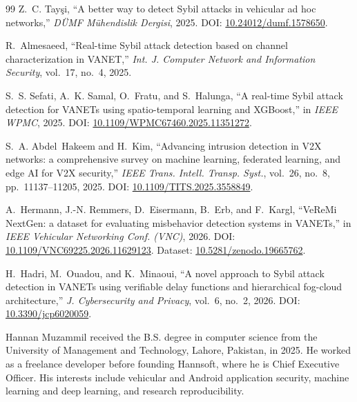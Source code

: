 \documentclass[journal,twoside]{IEEEtran}
\begin{document}
\begin{thebibliography}{99}
 Z.~C. Tay\c{s}i, ``A better way to detect Sybil attacks in vehicular ad hoc networks,'' \emph{D\"UMF M\"uhendislik Dergisi}, 2025. DOI: \url{10.24012/dumf.1578650}.

 R.~Almesaeed, ``Real-time Sybil attack detection based on channel characterization in VANET,'' \emph{Int. J. Computer Network and Information Security}, vol.~17, no.~4, 2025.

 S.~S. Sefati, A.~K. Samal, O.~Fratu, and S.~Halunga, ``A real-time Sybil attack detection for VANETs using spatio-temporal learning and XGBoost,'' in \emph{IEEE WPMC}, 2025. DOI: \url{10.1109/WPMC67460.2025.11351272}.

 S.~A. Abdel~Hakeem and H.~Kim, ``Advancing intrusion detection in V2X networks: a comprehensive survey on machine learning, federated learning, and edge AI for V2X security,'' \emph{IEEE Trans. Intell. Transp. Syst.}, vol.~26, no.~8, pp.~11137--11205, 2025. DOI: \url{10.1109/TITS.2025.3558849}.

 A.~Hermann, J.-N. Remmers, D.~Eisermann, B.~Erb, and F.~Kargl, ``VeReMi NextGen: a dataset for evaluating misbehavior detection systems in VANETs,'' in \emph{IEEE Vehicular Networking Conf. (VNC)}, 2026. DOI: \url{10.1109/VNC69225.2026.11629123}. Dataset: \url{10.5281/zenodo.19665762}.

 H.~Hadri, M.~Ouadou, and K.~Minaoui, ``A novel approach to Sybil attack detection in VANETs using verifiable delay functions and hierarchical fog-cloud architecture,'' \emph{J. Cybersecurity and Privacy}, vol.~6, no.~2, 2026. DOI: \url{10.3390/jcp6020059}.

\end{thebibliography}

\begin{IEEEbiographynophoto}{Hannan Muzammil}
received the B.S. degree in computer science from the University of Management
and Technology, Lahore, Pakistan, in 2025. He worked as a freelance developer
before founding Hannsoft, where he is Chief Executive Officer. His interests
include vehicular and Android application security, machine learning and deep
learning, and research reproducibility.
\end{IEEEbiographynophoto}
\end{document}

